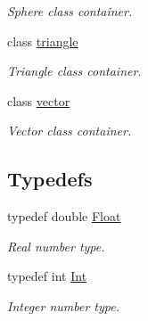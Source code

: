 \begin{DoxyCompactItemize}
\begin{DoxyCompactList}\small\item\em Sphere class container. \end{DoxyCompactList}\item 
class \hyperlink{classddd_1_1triangle}{triangle}
\begin{DoxyCompactList}\small\item\em Triangle class container. \end{DoxyCompactList}\item 
class \hyperlink{classddd_1_1vector}{vector}
\begin{DoxyCompactList}\small\item\em Vector class container. \end{DoxyCompactList}\end{DoxyCompactItemize}
\subsection*{Typedefs}
\begin{DoxyCompactItemize}
\item 
\mbox{\label{namespaceddd_a900cde04ff126705e451a03e280e1c7a}} 
typedef double \hyperlink{namespaceddd_a900cde04ff126705e451a03e280e1c7a}{Float}
\begin{DoxyCompactList}\small\item\em Real number type. \end{DoxyCompactList}\item 
\mbox{\label{namespaceddd_a50ea76e2b817cc6c6b4539c7f3c4bdad}} 
typedef int \hyperlink{namespaceddd_a50ea76e2b817cc6c6b4539c7f3c4bdad}{Int}
\begin{DoxyCompactList}\small\item\em Integer number type. \end{DoxyCompactList}\end{DoxyCompactItemize}
